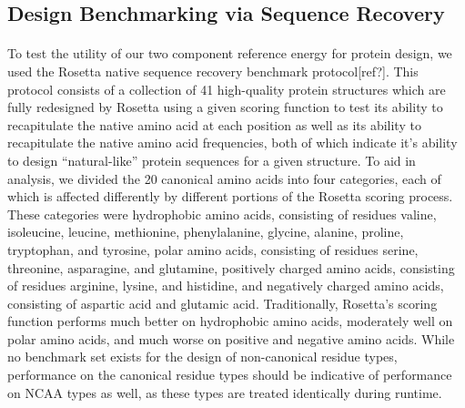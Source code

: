\subsection{Design Benchmarking via Sequence Recovery}
\paragraph{}
To test the utility of our two component reference energy for protein design, we used the Rosetta native sequence recovery benchmark protocol[ref?].
This protocol consists of a collection of 41 high-quality protein structures which are fully redesigned by Rosetta using a given scoring function to test its ability to recapitulate the native amino acid at each position as well as its ability to recapitulate the native amino acid frequencies, both of which indicate it's ability to design ``natural-like'' protein sequences for a given structure.
To aid in analysis, we divided the 20 canonical amino acids into four categories, each of which is affected differently by different portions of the Rosetta scoring process.
These categories were hydrophobic amino acids, consisting of residues valine, isoleucine, leucine, methionine, phenylalanine, glycine, alanine, proline, tryptophan, and tyrosine, polar amino acids, consisting of residues serine, threonine, asparagine, and glutamine, positively charged amino acids, consisting of residues arginine, lysine, and histidine, and negatively charged amino acids, consisting of aspartic acid and glutamic acid.
Traditionally, Rosetta's scoring function performs much better on hydrophobic amino acids, moderately well on polar amino acids, and much worse on positive and negative amino acids.
While no benchmark set exists for the design of non-canonical residue types, performance on the canonical residue types should be indicative of performance on NCAA types as well, as these types are treated identically during runtime.

